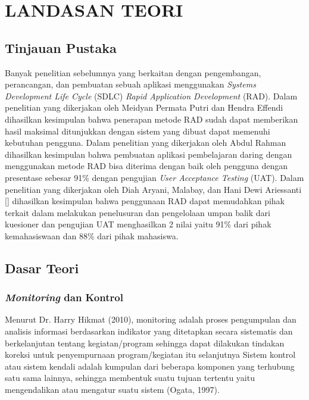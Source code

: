 \chapter{LANDASAN TEORI}

%
\vspace{4.5pt}

\begin{flushleft}
    \begin{justify}
        \section{Tinjauan Pustaka}
    Banyak penelitian sebelumnya yang berkaitan dengan pengembangan, perancangan, dan pembuatan sebuah aplikasi menggunakan
    \textit{Systems Development Life Cycle} (SDLC) \textit{Rapid Application Development} (RAD). Dalam penelitian yang dikerjakan oleh
    Meidyan Permata Putri dan Hendra Effendi \cite{web waterfall} dihasilkan kesimpulan bahwa penerapan metode RAD sudah dapat memberikan hasil maksimal ditunjukkan dengan sistem yang dibuat
    dapat memenuhi kebutuhan pengguna. Dalam penelitian yang dikerjakan oleh Abdul Rahman \cite{jurnal RAD UAT} dihasilkan kesimpulan bahwa pembuatan aplikasi pembelajaran daring dengan menggunakan metode RAD bisa diterima dengan baik oleh pengguna dengan presentase sebesar 91\% dengan pengujian \textit{User Acceptance Testing} (UAT).
    Dalam penelitian yang dikerjakan oleh Diah Aryani, Malabay, dan Hani Dewi Ariessanti [] dihasilkan kesimpulan bahwa penggunaan RAD dapat memudahkan pihak terkait dalam melakukan penelusuran dan pengelolaan umpan balik dari kuesioner dan
    pengujian UAT menghasilkan 2 nilai yaitu 91\% dari pihak kemahasiswaan dan 88\% dari pihak mahasiswa.

    \vspace{1cm}
    \section{Dasar Teori}

        \subsection{\textit{Monitoring} dan Kontrol}
        Menurut Dr. Harry Hikmat (2010), monitoring adalah proses pengumpulan
        dan analisis informasi berdasarkan indikator yang ditetapkan secara sistematis dan
        berkelanjutan tentang kegiatan/program sehingga dapat dilakukan tindakan
        koreksi untuk penyempurnaan program/kegiatan itu selanjutnya
        Sistem kontrol atau
        sistem kendali adalah kumpulan dari beberapa komponen yang terhubung satu
        sama lainnya, sehingga membentuk suatu tujuan tertentu yaitu mengendalikan
        atau mengatur suatu sistem (Ogata, 1997). 
        \\


\end{justify}
\end{flushleft}
